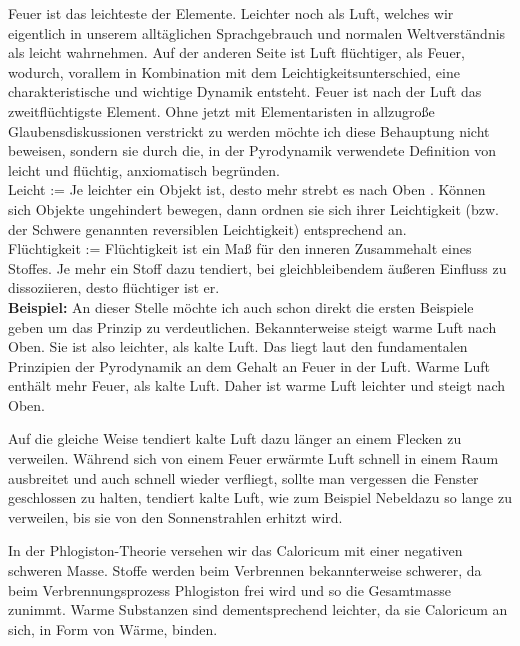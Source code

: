 \documentclass[a5paper,8pt]{book}
\begin{document}
Feuer ist das leichteste der Elemente. Leichter noch als Luft, welches wir eigentlich in unserem alltäglichen Sprachgebrauch und normalen Weltverständnis als leicht wahrnehmen. Auf der anderen Seite ist Luft flüchtiger, als Feuer, wodurch, vorallem in Kombination mit dem Leichtigkeitsunterschied, eine charakteristische und wichtige Dynamik entsteht. Feuer ist nach der Luft das zweitflüchtigste Element.
Ohne jetzt mit Elementaristen in allzugroße Glaubensdiskussionen verstrickt zu werden möchte ich diese Behauptung nicht 
beweisen, sondern sie durch die, in der Pyrodynamik verwendete Definition von leicht und flüchtig, anxiomatisch begründen.\\

Leicht := Je leichter ein Objekt ist, desto mehr strebt es nach Oben \footnotemark[1].
Können sich Objekte ungehindert bewegen, dann ordnen sie sich ihrer Leichtigkeit (bzw. der Schwere genannten reversiblen 
Leichtigkeit) entsprechend an.\\

Flüchtigkeit := Flüchtigkeit ist ein Maß für den inneren Zusammehalt eines Stoffes. Je mehr ein Stoff dazu tendiert, bei 
gleichbleibendem äußeren Einfluss zu dissoziieren, desto flüchtiger ist er.\\

\textbf{Beispiel:}
An dieser Stelle möchte ich auch schon direkt die ersten Beispiele geben um das Prinzip zu verdeutlichen. Bekannterweise 
steigt warme Luft nach Oben. Sie ist also leichter, als kalte Luft. Das liegt laut den fundamentalen Prinzipien der 
Pyrodynamik an dem Gehalt an Feuer in der Luft. Warme Luft enthält mehr Feuer, als kalte Luft. Daher ist warme Luft 
leichter und steigt nach Oben.

Auf die gleiche Weise tendiert kalte Luft dazu länger an einem Flecken zu verweilen. Während sich von einem Feuer erwärmte 
Luft schnell in einem Raum ausbreitet und auch schnell wieder verfliegt, sollte man vergessen die Fenster geschlossen 
zu halten, tendiert kalte Luft, wie zum Beispiel Nebel\footnotemark[2] dazu so lange zu verweilen, bis sie von den Sonnenstrahlen 
erhitzt wird\footnotemark[3].

In der Phlogiston-Theorie versehen wir das Caloricum mit einer negativen schweren Masse. Stoffe werden beim Verbrennen 
bekannterweise schwerer, da beim Verbrennungsprozess Phlogiston frei wird und so die Gesamtmasse zunimmt. Warme Substanzen 
sind dementsprechend leichter, da sie Caloricum an sich, in Form von Wärme, binden.
\end{document}
